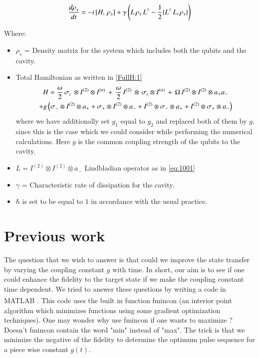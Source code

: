 \begin{equation}\label{eq:1002}
\frac { {d\rho}_{s}}{dt} = -{ i\thinspace } [{ H },\thinspace { \rho  }_{ s }] +\gamma \left({ { L }\thinspace{ \rho}_{ s } }\thinspace { L }^{ \dagger  }-\frac { 1 }{ 2 } \{ { L }^{ \dagger}\thinspace{L},{\rho  }_{ s }\}\right)
\end{equation}

Where:
\begin{itemize}
\item $\rho_{s}$ = Density matrix for the system which includes both the qubits and the cavity.
\item  Total Hamiltonian as written in \eqref{FullH:1}\begin{multline}\notag
H =\frac{\omega}{2}\thinspace{\sigma}_{z}\thinspace\otimes I^{(2)}\otimes{I^{(n)}}\thinspace +\thinspace\frac{\omega}{2}\thinspace{I^{(2)}}\thinspace\otimes\thinspace{\sigma}_{z}\otimes{I^{(n)}}\thinspace+\thinspace\Omega\thinspace I^{(2)}\otimes I^{(2)}\otimes{a}_{+}{a}_{- } \\
+ g \left({\sigma  }_{ - }\otimes I^{(2)}\otimes { a }_{ + } + { \sigma }_{+}\otimes I^{(2)}\otimes{a}_{ - }
+ I^{(2)}\otimes { \sigma  }_{ - }\otimes { a }_{ + }+I^{(2)}\otimes { \sigma  }_{ + }\otimes { a }_{ - }\right)
\end{multline} where we have additionally set $g_{1}$ equal to $g_{2}$ and replaced both of them by $g$, since this is the case which we could consider while performing the numerical calculations. Here $g$ is the common coupling strength of the qubits to the cavity.
\item $ {L} = I^{(2)} \otimes I^{(2)} \otimes {a}_{-} $  Lindbladian operator as in \eqref{eq:1001}
\item $\gamma$ = Characteristic rate of dissipation for the cavity. 
\item $\hbar$ is set to be equal to $1$ in accordance with the usual practice. 
\end{itemize}


\section{Previous work}
The question that we wish to answer is that could we improve the state transfer by varying the coupling constant $g$ with time. In short, our aim is to see if one could enhance the fidelity to the target state if we make the coupling constant time dependent.   We tried to answer these questions by writing a code  in MATLAB \textsuperscript{\textregistered}.  This code uses the built in function fmincon (an interior point algorithm which minimizes functions using some gradient optimization techniques).
One may wonder why  use fmincon if one wants to maximize ? Doesn't fmincon contain the word "min" instead of "max". The trick is that we minimize the negative of the fidelity to determine the optimum pulse sequence for a piece wise constant $g(t)$.


